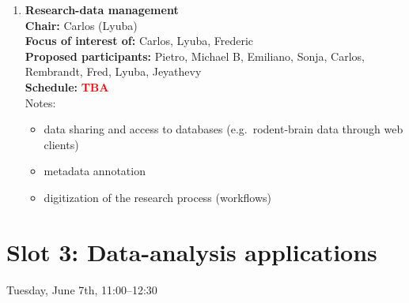 \documentclass[10pt, a4paper,twoside,american]{article}
\newcommand{\alert}[1]{\textcolor{red}{\bf #1}}
\begin{document}
\begin{enumerate}[resume]
  {\bf Proposed participants:} Alper, Sepehr, Daniel M, Michael D, Sven, Jyotika, Philipp, Johanna, Hannah, Moritz\\[1ex]
  {\bf Schedule:} \alert{TBA}\\[1ex]
  Notes:
  \begin{itemize}
  \item see books recommended by Benni W
  \end{itemize}
\item {\large\bf Research-data management}\\[1ex]
  {\bf Chair:} Carlos (Lyuba)\\[1ex]
  {\bf Focus of interest of:} Carlos, Lyuba, Frederic\\[1ex]
  {\bf Proposed participants:} Pietro, Michael B, Emiliano, Sonja, Carlos, Rembrandt, Fred, Lyuba, Jeyathevy\\[1ex]
  {\bf Schedule:} \alert{TBA}\\[1ex]
  Notes:
  \begin{itemize}
  \item data sharing and access to databases (e.g.~rodent-brain data through web clients)
  \item metadata annotation
  \item digitization of the research process (workflows)
  \end{itemize}
\end{enumerate}

\section*{Slot 3: Data-analysis applications}
Tuesday, June 7th, 11:00--12:30
\end{document}
